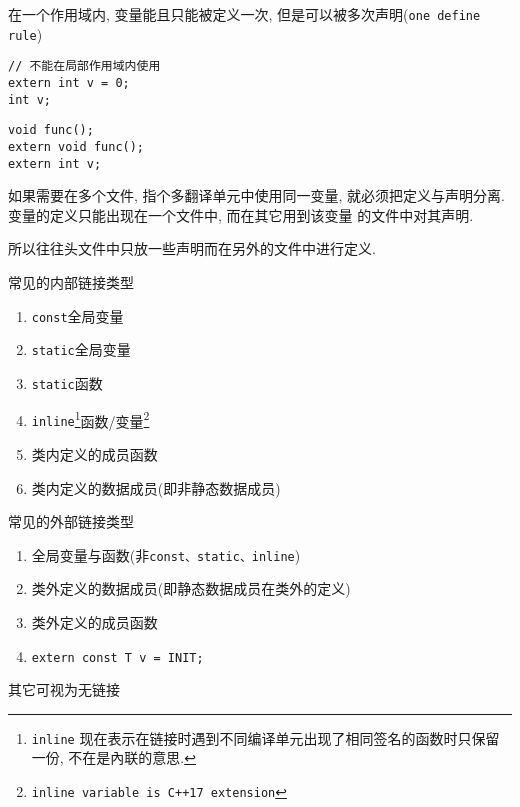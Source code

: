 在一个作用域内, 变量能且只能被定义一次, 但是可以被多次声明({\tt one define rule})
\begin{paracol}{2}
	\begin{leftcolumn}
		\begin{lstlisting}[title=定义,xleftmargin=2em,xrightmargin=2em]
// 不能在局部作用域内使用
extern int v = 0; 
int v;
		\end{lstlisting}
	\end{leftcolumn}
	\begin{rightcolumn}
		\begin{lstlisting}[title=声明,xleftmargin=2em,xrightmargin=2em]
void func();
extern void func();
extern int v;
		\end{lstlisting}
	\end{rightcolumn}
\end{paracol}

如果需要在多个文件, 指个多翻译单元中使用同一变量, 就必须把定义与声明分离. 变量的定义只能出现在一个文件中, 而在其它用到该变量
	的文件中对其声明.

所以往往头文件中只放一些声明而在另外的文件中进行定义.

\begin{paracol}{2}
	\begin{leftcolumn}
		常见的内部链接类型
		\begin{enumerate}
			\item {\tt const}全局变量
			\item {\tt static}全局变量
			\item {\tt static}函数
			\item {\tt inline}\footnote[1]{{\tt inline} 现在表示在链接时遇到不同编译单元出现了相同签名的函数时只保留一份, 不在是內联的意思.}函数/变量\footnote[2]{{\tt inline variable is C++17 extension}}
			\item 类内定义的成员函数
			\item 类内定义的数据成员(即非静态数据成员)
		\end{enumerate}
	\end{leftcolumn}
	\begin{rightcolumn}
		常见的外部链接类型
		\begin{enumerate}
			\item 全局变量与函数(非{\tt const、static、inline})
			\item 类外定义的数据成员(即静态数据成员在类外的定义)
			\item 类外定义的成员函数
			\item {\tt extern const T v = INIT;}
		\end{enumerate}
	\end{rightcolumn}
\end{paracol}
其它可视为无链接

